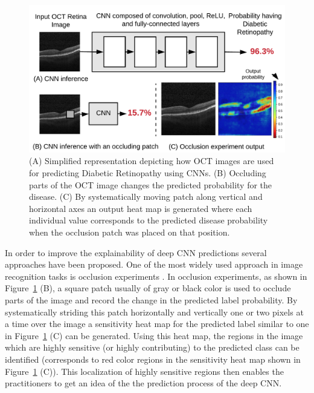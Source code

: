 \begin{figure}[t]
  \includegraphics[width=\columnwidth]{./images/krypton_overview}
  \caption{(A) Simplified representation depicting how OCT images are used for predicting Diabetic Retinopathy using CNNs. (B) Occluding parts of the OCT image changes the predicted probability for the disease. (C) By systematically moving patch along vertical and horizontal axes an output heat map is generated where each individual value corresponds to the predicted disease probability when the occlusion patch was placed on that position.}
  \label{fig:krypton_overview}
\end{figure}

In order to improve the explainability of deep CNN predictions several approaches have been proposed.
One of the most widely used approach in image recognition tasks is occlusion experiments \cite{zeiler2014visualizing}.
In occlusion experiments, as shown in Figure~\ref{fig:krypton_overview} (B), a square patch usually of gray or black color is used to occlude parts of the image and record the change in the predicted label probability.
By systematically striding this patch horizontally and vertically one or two pixels at a time over the image a sensitivity heat map for the predicted label similar to one in Figure~\ref{fig:krypton_overview} (C) can be generated.
Using this heat map, the regions in the image which are highly sensitive (or highly contributing) to the predicted class can be identified (corresponds to red color regions in the sensitivity heat map shown in Figure~\ref{fig:krypton_overview} (C)).
This localization of highly sensitive regions then enables the practitioners to get an idea of the the prediction process of the deep CNN.

